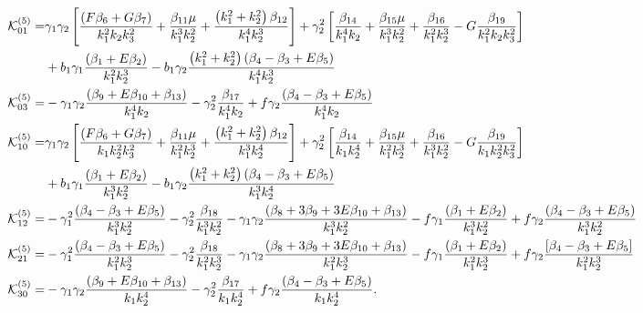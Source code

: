 \begin{align*}
\mathcal{K}_{01}^{(5)}=& \gamma_1 \gamma_2 \left[ \frac{\left( F \beta_{6} + G \beta_{7} \right)}{k_1^2 k_2 k_3^2} + \frac{\beta_{11} \mu}{k_1^3 k_2^2} + \frac{\left( k_1^2 + k_2^2 \right) \beta_{12} }{k_1^4 k_2^3} \right] + \gamma_2^2 \left[ \frac{\beta_{14}}{k_1^4 k_2} + \frac{\beta_{15} \mu }{k_1^3 k_2^2} + \frac{\beta_{16}}{k_1^2 k_2^3} - G \frac{\beta_{19}}{k_1^2 k_2 k_3^2} \right] \\
&+ b_1 \gamma_1 \frac{\left( \beta_1 + E \beta_2 \right)}{k_1^2 k_2^3} - b_1 \gamma_2 \frac{\left( k_1^2 + k_2^2\right) \left( {\beta_{4}-\beta_{3}} + E \beta_{5} \right)}{k_1^4 k_2^3} \\
\mathcal{K}_{03}^{(5)}=& - \gamma_1 \gamma_2 \frac{\left( \beta_{9} + E \beta_{10} + \beta_{13} \right)}{k_1^4 k_2} - \gamma_2^2 \frac{\beta_{17}}{k_1^4 k_2} + f \gamma_2 \frac{\left( {\beta_{4}-\beta_{3}} + E \beta_{5} \right)}{k_1^4 k_2 }\\
\mathcal{K}_{10}^{(5)}=&\gamma_1 \gamma_2 \left[ \frac{\left( F \beta_{6} + G \beta_{7} \right)}{k_1 k_2^2 k_3^2} + \frac{\beta_{11} \mu}{k_1^2 k_2^3} + \frac{\left( k_1^2 + k_2^2 \right) \beta_{12}}{k_1^3 k_2^4}\right] + \gamma_2^2 \left[ \frac{\beta_{14}}{k_1 k_2^4} + \frac{\beta_{15} \mu}{k_1^2 k_2^3} + \frac{\beta_{16}}{k_1^3 k_2^2} - G \frac{\beta_{19}}{k_1 k_2^2 k_3^2} \right] \\
&+ b_1 \gamma_1 \frac{\left( \beta_1 + E \beta_2 \right)}{k_1^3 k_2^2} - b_1 \gamma_2 \frac{\left( k_1^2 + k_2^2\right) \left( {\beta_{4}-\beta_{3}} + E \beta_{5} \right)}{k_1^3 k_2^4} \\
\mathcal{K}_{12}^{(5)}=& - \gamma_1^2 \frac{\left( {\beta_{4}-\beta_{3}} + E \beta_{5} \right)}{k_1^3 k_2^2} - \gamma_2^2 \frac{\beta_{18}}{k_1^3 k_2^2} - \gamma_1 \gamma_2 \frac{\left( \beta_{8} + 3 \beta_{9} + 3 E \beta_{10} + \beta_{13} \right) }{k_1^3 k_2^2} - f \gamma_1 \frac{\left( \beta_1 + E \beta_2 \right)}{k_1^3 k_2^2} + f \gamma_2 \frac{\left( {\beta_{4}-\beta_{3}} + E \beta_{5} \right)}{k_1^3 k_2^2}\\
\mathcal{K}_{21}^{(5)}=& - \gamma_1^2 \frac{\left( {\beta_{4}-\beta_{3}} + E \beta_{5} \right)}{k_1^2 k_2^3} - \gamma_2^2 \frac{\beta_{18}}{k_1^2 k_2^3} - \gamma_1 \gamma_2 \frac{\left( \beta_{8} + 3 \beta_{9} + 3 E \beta_{10} + \beta_{13} \right)}{k_1^2 k_2^3} - f \gamma_1 \frac{\left( \beta_1 + E \beta_2 \right)}{k_1^2 k_2^3} + f \gamma_2 \frac{\left[ {\beta_{4}-\beta_{3}} + E \beta_{5} \right]}{k_1^2 k_2^3} \\
\mathcal{K}_{30}^{(5)}=& -\gamma_1 \gamma_2 \frac{\left( \beta_{9} + E \beta_{10} + \beta_{13} \right)}{k_1 k_2^4} - \gamma_2^2 \frac{\beta_{17}}{k_1 k_2^4} + f \gamma_2 \frac{\left( {\beta_{4}-\beta_{3}} + E \beta_{5} \right)}{k_1 k_2^4} .
\end{align*}

